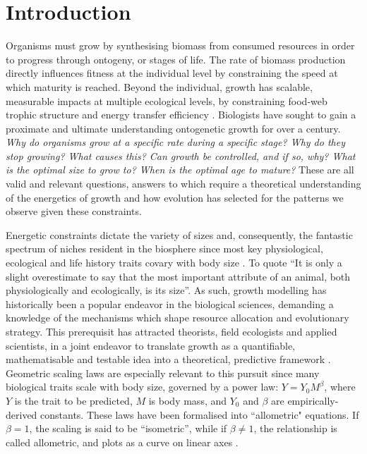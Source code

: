 \documentclass[a4paper]{article} %
\begin{document}
\newpage\tableofcontents\thispagestyle{plain}

\newpage\listoffigures\thispagestyle{plain}


\newpage
\section{Introduction}\thispagestyle{plain}
    Organisms must grow by synthesising biomass from consumed resources in order to progress through ontogeny, or stages of life. The rate of biomass production directly influences fitness at the individual level by constraining the speed at which maturity is reached. Beyond the individual, growth has scalable, measurable impacts at multiple ecological levels, by constraining food-web trophic structure and energy transfer efficiency \autocite{Barneche2018}. Biologists have sought to gain a proximate and ultimate understanding ontogenetic growth for over a century. \textit{Why do organisms grow at a specific rate during a specific stage? Why do they stop growing? What causes this? Can growth be controlled, and if so, why? What is the optimal size to grow to? When is the optimal age to mature?} These are all valid and relevant questions, answers to which require a theoretical understanding of the energetics of growth and how evolution has selected for the patterns we observe given these constraints. 
    
    Energetic constraints dictate the variety of sizes and, consequently, the fantastic spectrum of niches resident in the biosphere since most key physiological, ecological and life history traits covary with body size \autocite{peters1983, brown2000-scaling-book,schmidt1984scaling,Marshall2019b}. To quote \textcite{Bartholomew1981} ``It is only a slight overestimate to say that the most important attribute of an animal, both physiologically and ecologically, is its size''. As such, growth modelling has historically been a popular endeavor in the biological sciences, demanding a knowledge of the mechanisms which shape resource allocation and evolutionary strategy. This prerequisit has attracted theorists, field ecologists and applied scientists, in a joint endeavor to translate growth as a quantifiable, mathematisable and testable idea into a theoretical, predictive framework \autocite{popper1962,popper1972,peters1983, West2011}. Geometric scaling laws are especially relevant to this pursuit since many biological traits scale with body size, governed by a power law: $Y = Y_0 M^{\beta}$, where $Y$ is the trait to be predicted, $M$ is body mass, and $Y_0$ and $\beta$ are empirically-derived constants. These laws have been formalised into ``allometric" equations. If $\beta = 1$, the scaling is said to be ``isometric'', while if $\beta \neq 1$, the relationship is called allometric, and plots as a curve on linear axes \autocite{brown2000-scaling-book}.
\end{document}
